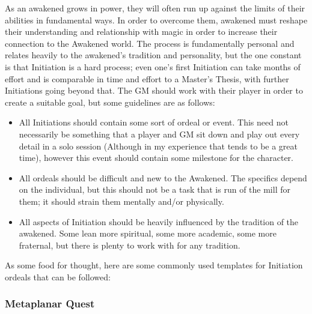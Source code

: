 \begin{multicols}{3}
	As an awakened grows in power, they will often run up against the limits of their abilities in fundamental ways. In order to overcome them, awakened must reshape their understanding and relationship with magic in order to increase their connection to the Awakened world. The process is fundamentally personal and relates heavily to the awakened's tradition and personality, but the one constant is that Initiation is a hard process; even one's first Initiation can take months of effort and is comparable in time and effort to a Master's Thesis, with further Initiations going beyond that. The GM should work with their player in order to create a suitable goal, but some guidelines are as follows:
	
	\begin{itemize}
		\itemsep 0pt
		\item All Initiations should contain some sort of ordeal or event. This need not necessarily be something that a player and GM sit down and play out every detail in a solo session (Although in my experience that tends to be a great time), however this event should contain some milestone for the character.
		\item All ordeals should be difficult and new to the Awakened. The specifics depend on the individual, but this should not be a task that is run of the mill for them; it should strain them mentally and/or physically.
		\item All aspects of Initiation should be heavily influenced by the tradition of the awakened. Some lean more spiritual, some more academic, some more fraternal, but there is plenty to work with for any tradition.
	\end{itemize}

	As some food for thought, here are some commonly used templates for Initiation ordeals that can be followed:
	
	\subsubsection*{Metaplanar Quest}
	

\end{multicols}
